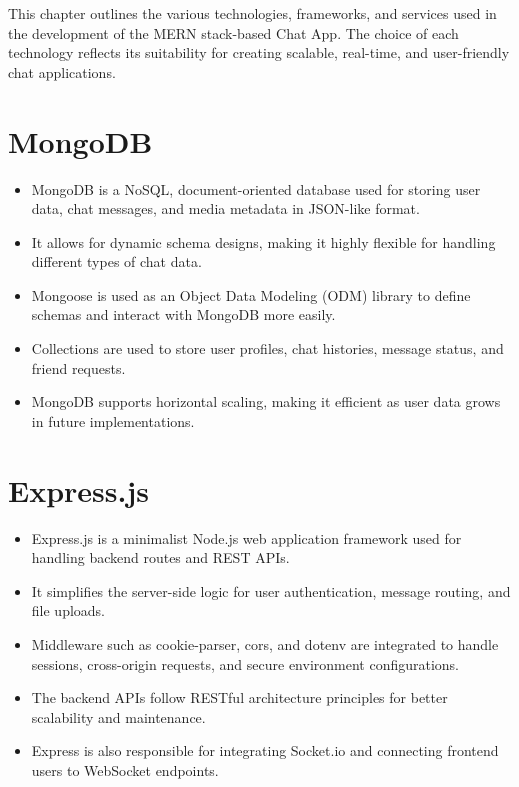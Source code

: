 \documentclass[12pt,a4paper]{report}
\begin{document}
This chapter outlines the various technologies, frameworks, and services used in the development of the MERN stack-based Chat App. The choice of each technology reflects its suitability for creating scalable, real-time, and user-friendly chat applications.

\section{MongoDB}
\begin{itemize}
    \item MongoDB is a NoSQL, document-oriented database used for storing user data, chat messages, and media metadata in JSON-like format.
    \item It allows for dynamic schema designs, making it highly flexible for handling different types of chat data.
    \item Mongoose is used as an Object Data Modeling (ODM) library to define schemas and interact with MongoDB more easily.
    \item Collections are used to store user profiles, chat histories, message status, and friend requests.
    \item MongoDB supports horizontal scaling, making it efficient as user data grows in future implementations.
\end{itemize}

\section{Express.js}
\begin{itemize}
    \item Express.js is a minimalist Node.js web application framework used for handling backend routes and REST APIs.
    \item It simplifies the server-side logic for user authentication, message routing, and file uploads.
    \item Middleware such as cookie-parser, cors, and dotenv are integrated to handle sessions, cross-origin requests, and secure environment configurations.
    \item The backend APIs follow RESTful architecture principles for better scalability and maintenance.
    \item Express is also responsible for integrating Socket.io and connecting frontend users to WebSocket endpoints.
\end{itemize}
\end{document}
